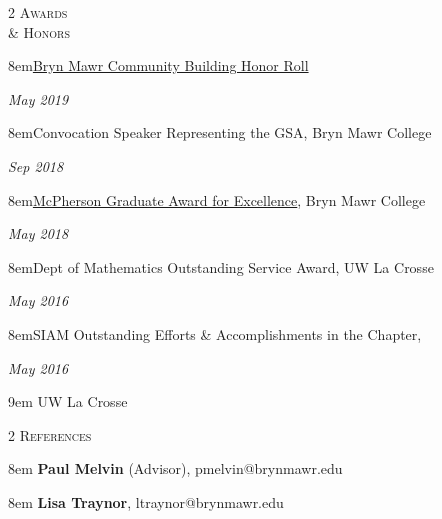 \documentclass[11pt]{article}
\newcommand{\itemreg}[1]{\begin{addmargin}[0em]{8em} #1 \end{addmargin}}
\newcommand{\itemregind}[1]{\begin{addmargin}[1.75em]{9em} #1 \end{addmargin}}
\newcommand{\itemregdate}[2]{\begin{addmargin}[0em]{8em}#1\end{addmargin}\vspace{-1.5em}\hfill\textit{#2}\\ \vspace{.25em}}
\begin{document}
\clearpage

\begin{multicols}{2}
	\textsc{Awards \\ \& Honors}
	
	\columnbreak
	
	\itemregdate{\href{https://www.brynmawr.edu/president/presidential-initiatives/community-belonging/community-building-honor-roll}{Bryn Mawr Community Building Honor Roll}}{May 2019}
		\vspace{.35em}
	\itemregdate{Convocation Speaker Representing the GSA, Bryn Mawr College}{Sep 2018}
		\vspace{.35em}
	\itemregdate{\href{https://www.brynmawr.edu/president/mcpherson-award-excellence}{McPherson Graduate Award for Excellence}, Bryn Mawr College}{May 2018}
		\vspace{.35em}
	\itemregdate{Dept of Mathematics Outstanding Service Award, UW La Crosse}{May 2016}
		\vspace{.35em}
	\itemregdate{SIAM Outstanding Efforts \& Accomplishments in the Chapter,}{May 2016}
	\itemregind{UW La Crosse}
\end{multicols}
\vspace{-.5em}



\begin{multicols}{2}
	\textsc{References}
	
	\columnbreak
	
	\itemreg{\textbf{Paul Melvin} (Advisor), pmelvin@brynmawr.edu}
	\itemreg{\textbf{Lisa Traynor}, ltraynor@brynmawr.edu}
\end{multicols}


		
\end{document}
